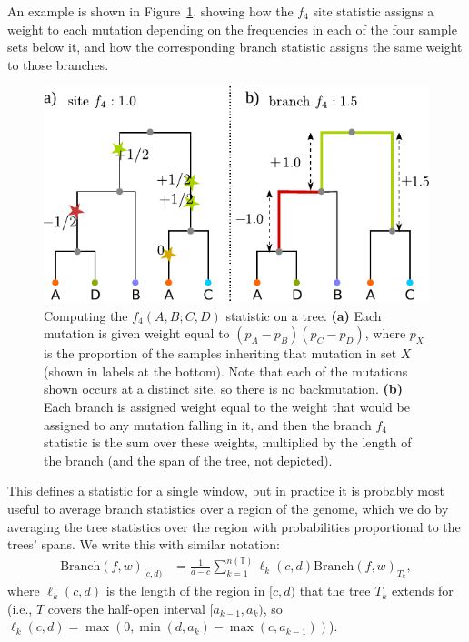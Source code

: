 \documentclass{article}
\newcommand{\branch}{\mbox{Branch}} %
\newcommand{\treeseq}{\mathbb{T}} %
\newcommand{\iw}{w} %
\begin{document}
An example is shown in Figure~\ref{fig:branch_site_diagram},
showing how the $f_4$ site statistic assigns a weight to each mutation
depending on the frequencies in each of the four sample sets below it,
and how the corresponding branch statistic assigns the same weight to those branches.

\begin{figure}
    \centering
    \includegraphics{figures/branch_site_diagram}
    \caption{
    Computing the $f_4(A,B;C,D)$ statistic on a tree.
    \textbf{(a)} Each mutation is given weight equal to $(p_A - p_B)(p_C - p_D)$,
    where $p_X$ is the proportion of the samples inheriting that mutation in set $X$
    (shown in labels at the bottom).
    Note that each of the mutations shown occurs at a distinct site, so there is no backmutation.
    \textbf{(b)} Each branch is assigned weight equal to the weight that would be assigned
    to any mutation falling in it, and then the branch $f_4$ statistic
    is the sum over these weights, multiplied by the length of the branch
    (and the span of the tree, not depicted).
        \label{fig:branch_site_diagram}
    }
\end{figure}


This defines a statistic for a single window,
but in practice it is probably most useful to average branch statistics
over a region of the genome,
which we do by averaging the tree statistics over the region
with probabilities proportional to the trees' spans.
We write this with similar notation:
\begin{align}
    \branch(f, \iw)_{[c,d)}
    &=
    \frac{1}{d-c} \sum_{k=1}^{n(\treeseq)} \ell_k(c,d) \branch(f, \iw)_{T_k} ,
\end{align}
where $\ell_k(c,d)$ is the length of the region in $[c,d)$ that the tree $T_k$ extends for
(i.e., $T$ covers the half-open interval $[a_{k-1},a_k)$,
so $\ell_k(c,d) = \max(0, \min(d,a_k) - \max(c,a_{k-1}))$).
\end{document}
